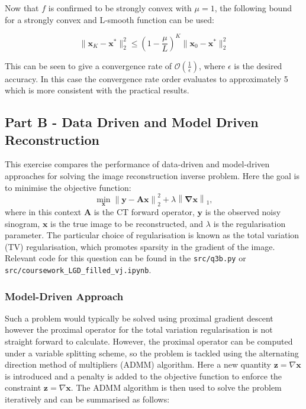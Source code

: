 \documentclass[11pt]{article}
\begin{document}
Now that \( f \) is confirmed to be strongly convex with \( \mu = 1 \), the following bound for a strongly convex and L-smooth function can be used:

\[
\|\mathbf{x}_K - \mathbf{x}^*\|_2^2 \leq \left(1 - \frac{\mu}{L}\right)^K \|\mathbf{x}_0 - \mathbf{x}^*\|_2^2
\]

This can be seen to give a convergence rate of $\mathcal{O}\left(\frac{1}{\epsilon}\right)$, where $\epsilon$ is the desired accuracy. In this case the convergence rate order evaluates to approximately 5 which is more consistent with the practical results.

\subsection{Part B - Data Driven and Model Driven Reconstruction}
This exercise compares the performance of data-driven and model-driven approaches for solving the image reconstruction inverse problem. Here the goal is to minimise the objective function:
\[
\min_{\mathbf{x}} \left\| \mathbf{y} - \mathbf{A} \mathbf{x} \right\|_2^2 + \lambda \left\| \mathbf \nabla \mathbf{x} \right\|_1,
\]
where in this context \( \mathbf{A} \) is the CT forward operator, \( \mathbf{y} \) is the observed noisy sinogram, \( \mathbf{x} \) is the true image to be reconstructed, and \( \lambda \) is the regularisation parameter. The particular choice of regularisation is known as the total variation (TV) regularisation, which promotes sparsity in the gradient of the image.
Relevant code for this question can be found in the \texttt{src/q3b.py} or \texttt{src/coursework\_LGD\_filled\_vj.ipynb}.
\subsubsection{Model-Driven Approach}
Such a problem would typically be solved using proximal gradient descent however the proximal operator for the total variation regularisation is not straight forward to calculate. However, the proximal operator can be computed under a variable splitting scheme, so the problem is tackled using the alternating direction method of multipliers (ADMM) algorithm. Here a new quantity \( \mathbf{z} = \nabla \mathbf{x}\) is introduced and a penalty is added to the objective function to enforce the constraint \( \mathbf{z} = \nabla \mathbf{x} \). The ADMM algorithm is then used to solve the problem iteratively and can be summarised as follows:
\end{document}
